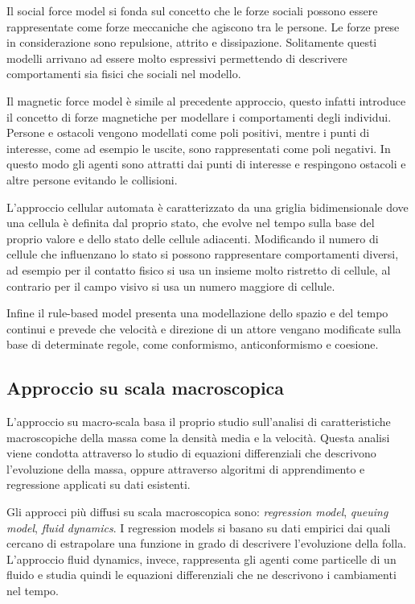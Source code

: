 Il social force model \cite{helbing} si fonda sul concetto che le forze sociali possono essere rappresentate come forze meccaniche che agiscono tra le persone. Le forze prese in considerazione sono repulsione, attrito e dissipazione. Solitamente questi modelli arrivano ad essere molto espressivi permettendo di descrivere comportamenti sia fisici che sociali nel modello.

Il magnetic force model \cite{okazaki} è simile al precedente approccio, questo infatti introduce il concetto di forze magnetiche per modellare i comportamenti degli individui. Persone e ostacoli vengono modellati come poli positivi, mentre i punti di interesse, come ad esempio le uscite, sono rappresentati come poli negativi. In questo modo gli agenti sono attratti dai punti di interesse e respingono ostacoli e altre persone evitando le collisioni.

L'approccio cellular automata \cite{dijkstra} è caratterizzato da una griglia bidimensionale dove una cellula è definita dal proprio stato, che evolve nel tempo sulla base del proprio valore e dello stato delle cellule adiacenti. Modificando il numero di cellule che influenzano lo stato si possono rappresentare comportamenti diversi, ad esempio per il contatto fisico si usa un insieme molto ristretto di cellule, al contrario per il campo visivo si usa un numero maggiore di cellule.

Infine il rule-based model \cite{reynolds} presenta una modellazione dello spazio e del tempo continui e prevede che velocità e  direzione di un attore vengano modificate sulla base di determinate regole, come conformismo, anticonformismo e coesione.

\subsection{Approccio su scala macroscopica}

L'approccio su macro-scala basa il proprio studio sull'analisi di caratteristiche macroscopiche della massa come la densità media e la velocità. Questa analisi viene condotta attraverso lo studio di equazioni differenziali che descrivono l'evoluzione della massa, oppure attraverso algoritmi di apprendimento e regressione applicati su dati esistenti. 

Gli approcci più diffusi su scala macroscopica sono: \textit{regression model}, \textit{queuing model}, \textit{fluid dynamics}. I regression models si basano su dati empirici dai quali cercano di estrapolare una funzione in grado di descrivere l'evoluzione della folla. L'approccio fluid dynamics, invece, rappresenta gli agenti come particelle di un fluido e studia quindi le equazioni differenziali che ne descrivono i cambiamenti nel tempo.

